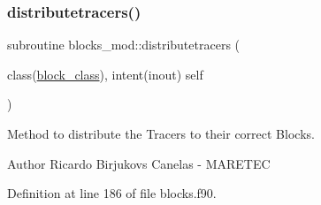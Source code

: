 \mbox{\label{namespaceblocks__mod_aa178415bcc40cf169744d356e1a09c6b}} 
\subsubsection{\texorpdfstring{distributetracers()}{distributetracers()}}
{\footnotesize\ttfamily subroutine blocks\+\_\+mod\+::distributetracers (\begin{DoxyParamCaption}\item[{class(\mbox{\hyperlink{structblocks__mod_1_1block__class}{block\+\_\+class}}), intent(inout)}]{self }\end{DoxyParamCaption})\hspace{0.3cm}{\ttfamily [private]}}



Method to distribute the Tracers to their correct Blocks. 

\begin{DoxyAuthor}{Author}
Ricardo Birjukovs Canelas -\/ M\+A\+R\+E\+T\+EC 
\end{DoxyAuthor}


Definition at line 186 of file blocks.\+f90.


